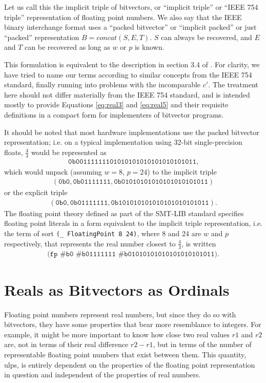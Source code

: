 \documentclass[letterpaper,10pt]{article}
\begin{document}
Let us call this the implicit triple of bitvectors, or ``implicit triple'' or ``IEEE 754 triple'' representation of floating point numbers. We also say that the IEEE binary interchange format uses a ``packed bitvector'' or ``implicit packed'' or just ``packed'' representation $B = concat(S, E, T)$. $S$ can always be recovered, and $E$ and $T$ can be recovered as long as $w$ or $p$ is known. 

This formulation is equivalent to the description in section 3.4 of \cite{ieee754-2008}. For clarity, we have tried to name our terms according to similar concepts from the IEEE 754 standard, finally running into problems with the incomparable $c'$. The treatment here should not differ materially from the IEEE 754 standard, and is intended mostly to provide Equations \ref{eq:real3} and \ref{eq:real5} and their requisite definitions in a compact form for implementers of bitvector programs.

It should be noted that most hardware implementations use the packed bitvector representation; i.e. on a typical implementation using 32-bit single-precision floats, $\frac{4}{3}$ would be represented as 
\begin{align*}
 \texttt{0b00111111101010101010101010101011} \text{,}
\end{align*}
which would unpack (assuming $w=8$, $p=24$) to the implicit triple 
\begin{align*}
 (\texttt{0b0}, \texttt{0b01111111}, \texttt{0b01010101010101010101011})
\end{align*}
or the explicit triple 
\begin{align*}
 (\texttt{0b0}, \texttt{0b01111111}, \texttt{0b101010101010101010101011}) \text{.}
\end{align*}
The floating point theory defined as part of the SMT-LIB standard specifies floating point literals in a form equivalent to the implicit triple representation, i.e. the term of sort \texttt{(\_ FloatingPoint 8 24)}, where 8 and 24 are $w$ and $p$ respectively, that represents the real number closest to $\frac{4}{3}$, is written 
\begin{align*}
 \texttt{(fp \#b0 \#b01111111 \#b01010101010101010101011)} \text{.}
\end{align*}
\section{Reals as Bitvectors as Ordinals}

Floating point numbers represent real numbers, but since they do so with bitvectors, they have some properties that bear more resemblance to integers. For example, it might be more important to know how close two real values $r1$ and $r2$ are, not in terms of their real difference $r2 - r1$, but in terms of the number of representable floating point numbers that exist between them. This quantity, ulps, is entirely dependent on the properties of the floating point representation in question and independent of the properties of real numbers.
\end{document}
